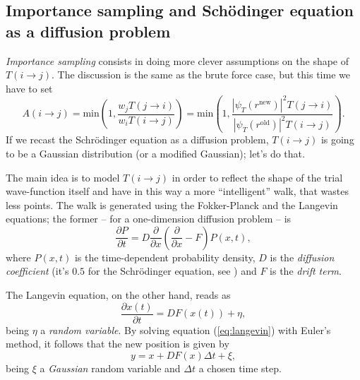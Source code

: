 \documentclass[a4paper,twoside,11pt]{book}
\begin{document}
\subsection{Importance sampling and Schödinger equation as a diffusion problem}
\label{sec:importance}

\emph{Importance sampling} consists in doing more clever assumptions on the shape of $T(i \rightarrow j)$. The discussion is the same as the brute force case, but this time we have to set
\begin{equation}
	A(i\rightarrow j) 
	= \text{min} \left(1, \frac{w_jT(j \rightarrow i)}{w_iT(i \rightarrow j)} \right)
	= \text{min} \left(1, \frac{|\psi_T(r^{\text{new}})|^2T(j \rightarrow i)}{|\psi_T(r^{\text{old}})|^2T(i \rightarrow j)} \right).
	\label{eq:acceptance_imp}
\end{equation}
If we recast the Schr\"{o}dinger equation as a diffusion problem, $T(i \rightarrow j)$ is going to be a Gaussian distribution (or a modified Gaussian); let's do that.

The main idea is to model $T(i \rightarrow j)$ in order to reflect the shape of the trial wave-function itself and have in this way a more ``intelligent'' walk, that wastes less points. The walk is generated using the Fokker-Planck and the Langevin equations; the former -- for a one-dimension diffusion problem -- is
\begin{equation}
	\frac{\partial P}{\partial t} = D \dfrac{\partial}{\partial x} \left( \dfrac{\partial}{\partial x} - F \right)P(x,t),
\end{equation}
where
$P(x,t)$ is the time-dependent probability density, $D$ is the \emph{diffusion coefficient} (it's $0.5$ for the Schr\"{o}dinger equation, see \cite{jorgen}) and $F$ is the \emph{drift term}.

The Langevin equation, on the other hand, reads as
\begin{equation}
	\frac{\partial x(t)}{\partial t} = DF(x(t)) + \eta,
	\label{eq:langevin}
\end{equation}
being $\eta$ a \emph{random variable}. By solving equation (\ref{eq:langevin}) with Euler's method, it follows that the new position is given by
\begin{equation}
	y = x + DF(x)\Delta t + \xi,
\end{equation}
being $\xi$ a \emph{Gaussian} random variable and $\Delta t$ a chosen time step.
\end{document}
